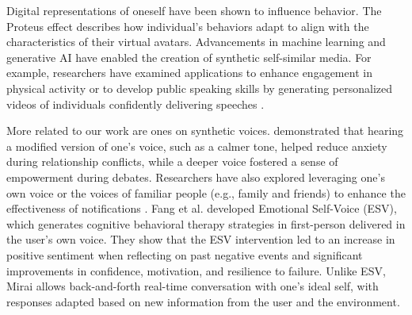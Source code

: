 
Digital representations of oneself have been shown to influence behavior. The Proteus effect \cite{yee2007proteus} describes how individual's behaviors adapt to align with the characteristics of their virtual avatars. Advancements in machine learning and generative AI have enabled the creation of synthetic self-similar media. For example, researchers have examined applications to enhance engagement in physical activity \cite{clarke2023fakeforward} or to develop public speaking skills by generating personalized videos of individuals confidently delivering speeches \cite{clarke2023fakeforward,leong2021investigating}. 

More related to our work are ones on synthetic voices. \citet{costa2018regulating} demonstrated that hearing a modified version of one’s voice, such as a calmer tone, helped reduce anxiety during relationship conflicts, while a deeper voice fostered a sense of empowerment during debates. Researchers have also explored leveraging one’s own voice \cite{kim2024myvoice} or the voices of familiar people (e.g., family and friends) to enhance the effectiveness of notifications \cite{chan2021kinvoices}.  Fang et al. developed Emotional Self-Voice (ESV), which generates cognitive behavioral therapy strategies in first-person delivered in the user's own voice. They show that the ESV intervention led to an increase in positive sentiment when reflecting on past negative events and significant improvements in confidence, motivation, and resilience to failure. Unlike ESV, Mirai allows back-and-forth real-time conversation with one's ideal self, with responses adapted based on new information from the user and the environment.